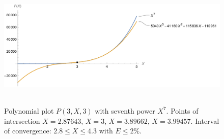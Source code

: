 ﻿\begin{figure}[H]
    \centering
    \includegraphics[width=1\textwidth]{sections/images/05_plots_polynomial_p3_n3_with_seventh}
    ~\caption{Polynomial plot $P(3, X, 3)$ with seventh power $X^7$.
    Points of intersection $X=2.87643$, $X=3$, $X=3.89662$, $X=3.99457$.
    Interval of convergence: $2.8 \leq X \leq 4.3$ with $E \leq 2\%$.
    }\label{fig:figure11}
\end{figure}
